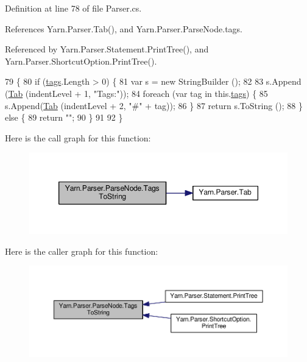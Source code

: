 Definition at line 78 of file Parser.\-cs.



References Yarn.\-Parser.\-Tab(), and Yarn.\-Parser.\-Parse\-Node.\-tags.



Referenced by Yarn.\-Parser.\-Statement.\-Print\-Tree(), and Yarn.\-Parser.\-Shortcut\-Option.\-Print\-Tree().


\begin{DoxyCode}
79             \{
80                 \textcolor{keywordflow}{if} (\hyperlink{a00138_a58b3a15788fd2d4127d73619dc6d04ae}{tags}.Length > 0) \{
81                     var s = \textcolor{keyword}{new} StringBuilder ();
82 
83                     s.Append (\hyperlink{a00139_aa8fa36b46de12a1c561d77b99c4b9ae3}{Tab} (indentLevel + 1, \textcolor{stringliteral}{"Tags:"}));
84                     \textcolor{keywordflow}{foreach} (var tag \textcolor{keywordflow}{in} this.\hyperlink{a00138_a58b3a15788fd2d4127d73619dc6d04ae}{tags}) \{
85                         s.Append(\hyperlink{a00139_aa8fa36b46de12a1c561d77b99c4b9ae3}{Tab} (indentLevel + 2, \textcolor{stringliteral}{"#"} + tag));
86                     \}
87                     \textcolor{keywordflow}{return} s.ToString ();
88                 \} \textcolor{keywordflow}{else} \{
89                     \textcolor{keywordflow}{return} \textcolor{stringliteral}{""};
90                 \}
91 
92             \}
\end{DoxyCode}


Here is the call graph for this function\-:
\nopagebreak
\begin{figure}[H]
\begin{center}
\leavevmode
\includegraphics[width=350pt]{a00138_a054f36c80d5eeacd569a8859f599af67_cgraph}
\end{center}
\end{figure}




Here is the caller graph for this function\-:
\nopagebreak
\begin{figure}[H]
\begin{center}
\leavevmode
\includegraphics[width=350pt]{a00138_a054f36c80d5eeacd569a8859f599af67_icgraph}
\end{center}
\end{figure}


